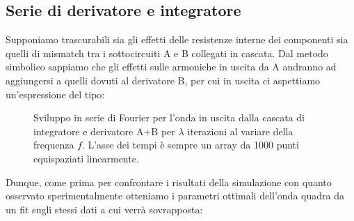 \documentclass{article}[a4paper, oneside ,11pt]
\begin{document}
\subsection{Serie di derivatore e integratore}
Supponiamo trascurabili sia gli effetti delle resistenze interne dei componenti sia quelli di mismatch tra i sottocircuiti A e B collegati in cascata. Dal metodo simbolico sappiamo che gli effetti sulle armoniche in uscita da A andranno ad aggiungersi a quelli dovuti al derivatore B, per cui in uscita ci aspettiamo un'espressione del tipo:

\begin{figure}[!htb]
	\scalebox{0.55}{}\hfill \scalebox{0.55}{}
	\scalebox{0.55}{}\hfill \scalebox{0.55}{}
 	\caption{Sviluppo in serie di Fourier per l'onda in uscita dalla cascata di integratore e derivatore A+B per $\lambda$ iterazioni al variare della frequenza $f$. L'asse dei tempi è sempre un array da 1000 punti equispaziati linearmente. \label{plt:cas}}
\end{figure}
Dunque, come prima per confrontare i risultati della simulazione con quanto osservato sperimentalmente otteniamo i parametri ottimali dell'onda quadra da un fit sugli stessi dati a cui verrà sovrapposta:\\

\end{document}
